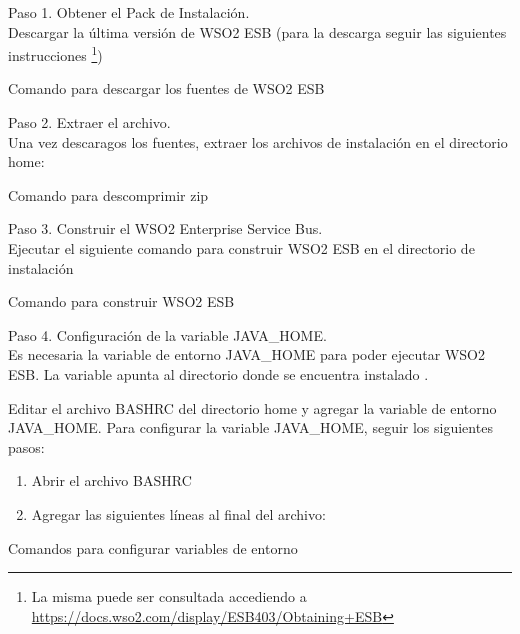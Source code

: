 Paso 1. Obtener el Pack de Instalación.\\
Descargar la última versión de WSO2 ESB (para la descarga seguir las siguientes instrucciones \footnote{La misma puede ser consultada accediendo a \url{https://docs.wso2.com/display/ESB403/Obtaining+ESB}})

\begin{listing}[H]
  \caption{Comando para descargar los fuentes de WSO2 ESB}
  \label{soa:tecnologias:wso2:bash-descargar-fuentes}
\end{listing}

Paso 2. Extraer el archivo.\\
Una vez descaragos los fuentes, extraer los archivos de instalación en el directorio home:

\begin{listing}[H]
  \caption{Comando para descomprimir zip}
  \label{soa:tecnologias:wso2:bash-descomprimir-zip}
\end{listing}

Paso 3. Construir el WSO2 Enterprise Service Bus.\\
Ejecutar el siguiente comando para construir WSO2 ESB en el directorio de instalación

\begin{listing}[H]
  \caption{Comando para construir WSO2 ESB}
  \label{soa:tecnologias:wso2:bash-maven-clean}
\end{listing}

Paso 4. Configuración de la variable JAVA\_HOME.\\
Es necesaria la variable de entorno JAVA\_HOME para poder ejecutar WSO2 ESB.  La variable apunta al directorio donde se encuentra instalado .

Editar el archivo BASHRC del directorio home y agregar la variable de entorno JAVA\_HOME.  Para configurar la variable JAVA\_HOME, seguir los siguientes pasos:

\begin{enumerate}
  \item Abrir el archivo BASHRC
  \item Agregar las siguientes líneas al final del archivo:
\end{enumerate}

\begin{listing}[H]
  \caption{Comandos para configurar variables de entorno}
  \label{soa:tecnologias:wso2:bash-configurar-variables-de-entorno}
\end{listing}

